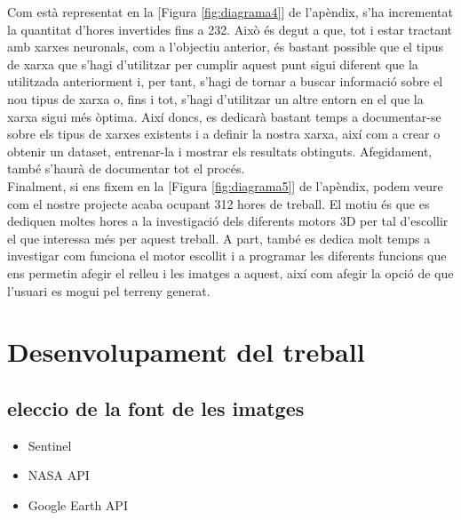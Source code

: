 ﻿\documentclass[10pt,a4paper,twocolumn,twoside]{article}
\begin{document}
Com està representat en la [Figura \ref{fig:diagrama4}] de l'apèndix, s'ha incrementat la quantitat d'hores invertides fins a 232.
Això és degut a que, tot i estar tractant amb xarxes neuronals, com a l'objectiu anterior, és bastant possible que el tipus de xarxa que s'hagi d'utilitzar per cumplir aquest punt sigui diferent que la utilitzada anteriorment i, per tant, s'hagi de tornar a buscar informació  sobre el nou tipus de xarxa o, fins i tot, s'hagi d'utilitzar un altre entorn en el que la xarxa sigui més òptima.
Així doncs, es dedicarà bastant temps a documentar-se sobre els tipus de xarxes existents i a definir la nostra xarxa, així com a crear o obtenir un dataset, entrenar-la i mostrar els resultats obtinguts.
Afegidament, també s'haurà de documentar tot el procés.\\

Finalment, si ens fixem en la [Figura \ref{fig:diagrama5}] de l'apèndix, podem veure com el nostre projecte acaba ocupant 312 hores de treball. 
El motiu és que es dediquen moltes hores a la investigació dels diferents motors 3D per tal d'escollir el que interessa més per aquest treball. A part, també es dedica molt temps a investigar com funciona el motor escollit i a programar les diferents funcions que ens permetin afegir el relleu i les imatges a aquest, així com afegir la opció de que l'usuari es mogui pel terreny generat.\\


\section{Desenvolupament del treball}
\subsection{eleccio de la font de les imatges}
\begin{itemize}
\item Sentinel \cite{Sentinel}
\item NASA API \cite{NASA}
\item Google Earth API \cite{Earth}

\end{itemize}
\end{document}
